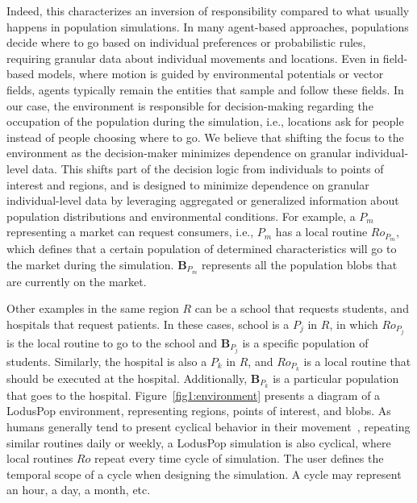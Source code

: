 \documentclass[pdflatex,sn-mathphys-num]{sn-jnl}%
\newcommand\red[1]{#1}
\newcommand\redb[1]{#1}
\theoremstyle{thmstyleone}%
\theoremstyle{thmstyletwo}%
\theoremstyle{thmstylethree}%
\begin{document}
Indeed, this characterizes an inversion of responsibility compared to what usually happens in population simulations. \redb{In many agent-based approaches, populations decide where to go based on individual preferences or probabilistic rules, requiring granular data about individual movements and locations. Even in field-based models, where motion is guided by environmental potentials or vector fields, agents typically remain the entities that sample and follow these fields.
In our case, the environment is responsible for decision-making regarding the occupation of the population during the simulation, i.e., locations ask for people instead of people choosing where to go. We believe that shifting the focus to the environment as the decision-maker minimizes dependence on granular individual-level data. This shifts part of the decision logic from individuals to points of interest and regions, and is designed to minimize dependence on granular individual-level data by leveraging aggregated or generalized information about population distributions and environmental conditions. }%
For example, a $P_m$ representing a market can request consumers, i.e., $P_m$ has a local routine $Ro_{P_m}$, which defines that a certain population of determined characteristics will go to the market during the simulation. $\bm{B}_{P_m}$ represents all the population blobs that are currently on the market.

Other examples in the same region $R$ can be a school that requests students, and hospitals that request patients. In these cases, school is a $P_j$ in $R$, in which $Ro_{P_j}$ is the local routine to go to the school and $\bm{B}_{P_j}$ is a specific population of students. 
\red{Similarly, the hospital is also a $P_k$ in $R$, and $Ro_{P_k}$ is a local routine that should be executed at the hospital.} 
Additionally, $\bm{B}_{P_k}$ is a particular population that goes to the hospital. \red{Figure~\ref{fig1:environment} presents a diagram of a LodusPop environment, representing regions, points of interest, and blobs.}
As humans generally tend to present cyclical behavior in their movement~\citep{gonzalez2008understanding}, repeating similar routines daily or weekly, a LodusPop simulation is also cyclical, where local routines $Ro$ repeat every time cycle of simulation. 
The user defines the temporal scope of a cycle when designing the simulation. A cycle may represent an hour, a day, a month, etc.
\end{document}
